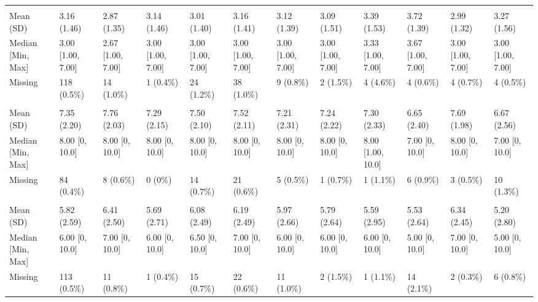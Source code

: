 \documentclass[
  single column]{article}
\begin{document}
\begin{landscape}
\begin{tabular}[t]{llllllllllll}
\addlinespace[0.3em]
\multicolumn{12}{l}{\textbf{perfectionism}}\\
\hspace{1em}Mean (SD) & 3.16 (1.46) & 2.87 (1.35) & 3.14 (1.46) & 3.01 (1.40) & 3.16 (1.41) & 3.12 (1.39) & 3.09 (1.51) & 3.39 (1.53) & 3.72 (1.39) & 2.99 (1.32) & 3.27 (1.56)\\
\hspace{1em}Median [Min, Max] & 3.00 [1.00, 7.00] & 2.67 [1.00, 7.00] & 3.00 [1.00, 7.00] & 3.00 [1.00, 7.00] & 3.00 [1.00, 7.00] & 3.00 [1.00, 7.00] & 3.00 [1.00, 7.00] & 3.33 [1.00, 7.00] & 3.67 [1.00, 7.00] & 3.00 [1.00, 7.00] & 3.00 [1.00, 7.00]\\
\hspace{1em}Missing & 118 (0.5\%) & 14 (1.0\%) & 1 (0.4\%) & 24 (1.2\%) & 38 (1.0\%) & 9 (0.8\%) & 2 (1.5\%) & 4 (4.6\%) & 4 (0.6\%) & 4 (0.7\%) & 4 (0.5\%)\\
\addlinespace[0.3em]
\multicolumn{12}{l}{\textbf{pwb\_standard\_living}}\\
\hspace{1em}Mean (SD) & 7.35 (2.20) & 7.76 (2.03) & 7.29 (2.15) & 7.50 (2.10) & 7.52 (2.11) & 7.21 (2.31) & 7.24 (2.22) & 7.30 (2.33) & 6.65 (2.40) & 7.69 (1.98) & 6.67 (2.56)\\
\hspace{1em}Median [Min, Max] & 8.00 [0, 10.0] & 8.00 [0, 10.0] & 8.00 [0, 10.0] & 8.00 [0, 10.0] & 8.00 [0, 10.0] & 8.00 [0, 10.0] & 8.00 [0, 10.0] & 8.00 [1.00, 10.0] & 7.00 [0, 10.0] & 8.00 [0, 10.0] & 7.00 [0, 10.0]\\
\hspace{1em}Missing & 84 (0.4\%) & 8 (0.6\%) & 0 (0\%) & 14 (0.7\%) & 21 (0.6\%) & 5 (0.5\%) & 1 (0.7\%) & 1 (1.1\%) & 6 (0.9\%) & 3 (0.5\%) & 10 (1.3\%)\\
\addlinespace[0.3em]
\multicolumn{12}{l}{\textbf{pwb\_your\_future\_security}}\\
\hspace{1em}Mean (SD) & 5.82 (2.59) & 6.41 (2.50) & 5.69 (2.71) & 6.08 (2.49) & 6.19 (2.49) & 5.97 (2.66) & 5.79 (2.64) & 5.59 (2.95) & 5.53 (2.64) & 6.34 (2.45) & 5.20 (2.80)\\
\hspace{1em}Median [Min, Max] & 6.00 [0, 10.0] & 7.00 [0, 10.0] & 6.00 [0, 10.0] & 6.50 [0, 10.0] & 7.00 [0, 10.0] & 6.00 [0, 10.0] & 6.00 [0, 10.0] & 6.00 [0, 10.0] & 5.00 [0, 10.0] & 7.00 [0, 10.0] & 5.00 [0, 10.0]\\
\hspace{1em}Missing & 113 (0.5\%) & 11 (0.8\%) & 1 (0.4\%) & 15 (0.7\%) & 22 (0.6\%) & 11 (1.0\%) & 2 (1.5\%) & 1 (1.1\%) & 14 (2.1\%) & 2 (0.3\%) & 6 (0.8\%)\\

\end{tabular}
\end{landscape}
\end{document}
